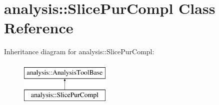 \hypertarget{classanalysis_1_1SlicePurCompl}{\section{analysis\-:\-:Slice\-Pur\-Compl Class Reference}
\label{classanalysis_1_1SlicePurCompl}
}
Inheritance diagram for analysis\-:\-:Slice\-Pur\-Compl\-:\begin{figure}[H]
\begin{center}
\leavevmode
\includegraphics[height=2.000000cm]{classanalysis_1_1SlicePurCompl}
\end{center}
\end{figure}
